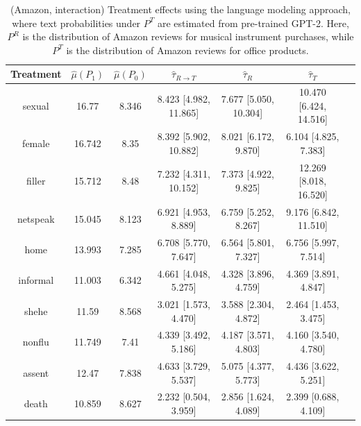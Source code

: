 \documentclass{article}
\begin{document}
\begin{table}[!ht]
    \centering
    \begin{tabular}{c|cccccc}
\toprule
    Treatment   &   $\hat{\mu}(P_1)$ &   $\hat{\mu}(P_0)$ & $\hat{\tau}_{R \rightarrow T}$   & $\hat{\tau}_R$        & $\hat{\tau}_T$         \\
\midrule
    sexual      &             16.77  &              8.346 & 8.423 [4.982, 11.865]            & 7.677 [5.050, 10.304] & 10.470 [6.424, 14.516] \\
    female      &             16.742 &              8.35  & 8.392 [5.902, 10.882]            & 8.021 [6.172, 9.870]  & 6.104 [4.825, 7.383]   \\
    filler      &             15.712 &              8.48  & 7.232 [4.311, 10.152]            & 7.373 [4.922, 9.825]  & 12.269 [8.018, 16.520] \\
    netspeak    &             15.045 &              8.123 & 6.921 [4.953, 8.889]             & 6.759 [5.252, 8.267]  & 9.176 [6.842, 11.510]  \\
    home        &             13.993 &              7.285 & 6.708 [5.770, 7.647]             & 6.564 [5.801, 7.327]  & 6.756 [5.997, 7.514]   \\
    informal    &             11.003 &              6.342 & 4.661 [4.048, 5.275]             & 4.328 [3.896, 4.759]  & 4.369 [3.891, 4.847]   \\
    shehe       &             11.59  &              8.568 & 3.021 [1.573, 4.470]             & 3.588 [2.304, 4.872]  & 2.464 [1.453, 3.475]   \\
    nonflu      &             11.749 &              7.41  & 4.339 [3.492, 5.186]             & 4.187 [3.571, 4.803]  & 4.160 [3.540, 4.780]   \\
    assent      &             12.47  &              7.838 & 4.633 [3.729, 5.537]             & 5.075 [4.377, 5.773]  & 4.436 [3.622, 5.251]   \\
    death       &             10.859 &              8.627 & 2.232 [0.504, 3.959]             & 2.856 [1.624, 4.089]  & 2.399 [0.688, 4.109]   \\
\bottomrule
    \end{tabular}
    \caption{(Amazon, interaction) Treatment effects using the language modeling approach, where text probabilities under $P^T$ are estimated from pre-trained GPT-2. Here, $P^R$ is the distribution of Amazon reviews for musical instrument purchases, while $P^T$ is the distribution of Amazon reviews for office products.}
    \label{tab:results_clm_gpt2_amazon_synthetic_interaction}
\end{table}
\end{document}
